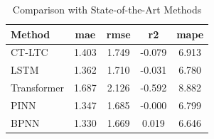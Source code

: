 \begin{table}[htbp]
\centering
\caption{Comparison with State-of-the-Art Methods}
\label{tab:table2_industrial_results}
\begin{tabular}{lcccc}
\toprule
Method & \textbf{mae} & \textbf{rmse} & \textbf{r2} & \textbf{mape} \\
\midrule
CT-LTC & 1.403 & 1.749 & -0.079 & 6.913 \\
LSTM & 1.362 & 1.710 & -0.031 & 6.780 \\
Transformer & 1.687 & 2.126 & -0.592 & 8.882 \\
PINN & 1.347 & 1.685 & -0.000 & 6.799 \\
BPNN & 1.330 & 1.669 & 0.019 & 6.646 \\
\bottomrule
\end{tabular}
\end{table}